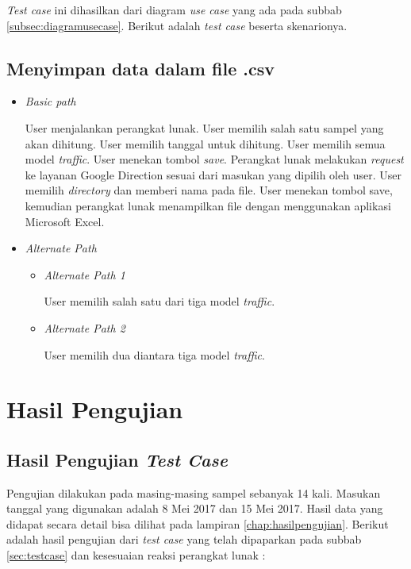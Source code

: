 \textit{Test case} ini dihasilkan dari diagram \textit{use case} yang ada pada subbab \ref{subsec:diagramusecase}. Berikut adalah \textit{test case} beserta skenarionya.

\subsection{Menyimpan data dalam file .csv}
\label{subsec:menyimpandata}

\begin{itemize}
	\item \textit{Basic path} 
	
	User menjalankan perangkat lunak. User memilih salah satu sampel yang akan dihitung. User memilih tanggal untuk dihitung. User memilih semua model \textit{traffic}. User menekan tombol \textit{save}. Perangkat lunak melakukan \textit{request} ke layanan Google Direction sesuai dari masukan yang dipilih oleh user. User memilih \textit{directory} dan memberi nama pada file. User menekan tombol save, kemudian perangkat lunak menampilkan file dengan menggunakan aplikasi Microsoft Excel.
	
	\item \textit{Alternate Path}
	\begin{itemize}
		\item \textit{Alternate Path 1}
		
		User memilih salah satu dari tiga model \textit{traffic}.
		
		\item \textit{Alternate Path 2}
		
		User memilih dua diantara tiga model \textit{traffic}.
		
	\end{itemize}
\end{itemize}

\section{Hasil Pengujian}
\label{sec:hasilpengujian}

\subsection{Hasil Pengujian \textit{Test Case}}
\label{sec:hasilpengujiantestcase}

Pengujian dilakukan pada masing-masing sampel sebanyak 14 kali. Masukan tanggal yang digunakan adalah 8 Mei 2017 dan 15 Mei 2017. Hasil data yang didapat secara detail bisa dilihat pada lampiran \ref{chap:hasilpengujian}. Berikut adalah hasil pengujian dari \textit{test case} yang telah dipaparkan pada subbab \ref{sec:testcase} dan kesesuaian reaksi perangkat lunak :

